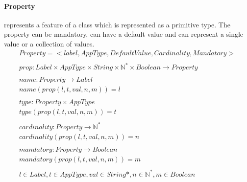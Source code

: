 \documentclass[11pt]{article}
\begin{document}
\paragraph{Property} represents a feature of  a class which is represented as a primitive type. The property can be mandatory, can have a default value and can represent a single value or a collection of values.
\begin{gather*}
Property = <label, AppType, DefaultValue, Cardinality, Mandatory> \\ \\
prop : Label \times AppType \times String \times \mathbb{N^{*}} \times Boolean \rightarrow Property \\ \\
name : Property \rightarrow Label \\
name(prop(l, t, val, n, m)) = l \\ \\
type : Property \times AppType \\
type(prop(l, t, val, n, m)) = t \\ \\
cardinality : Property \rightarrow \mathbb{N^{*}} \\
cardinality(prop(l, t, val, n, m)) = n \\ \\
mandatory : Property \rightarrow Boolean \\
mandatory(prop(l, t, val, n, m)) = m  \\ \\
l \in Label, t \in AppType, val \in String*, n \in \mathbb{N^{*}}, m \in Boolean
\end{gather*}


\end{document}
